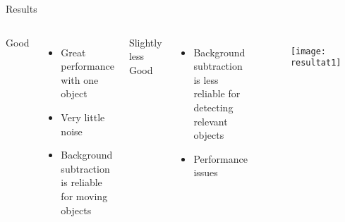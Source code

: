 
\begin{frame}{Results}


	 \begin{columns}[c] %
Good
	\begin{itemize}
	\item Great performance with one object
	\item Very little noise
	\item Background subtraction is reliable for moving objects
	\end{itemize}
	
	\vspace{4mm}
Slightly less Good
	\begin{itemize}
	\item Background subtraction is less reliable for detecting relevant objects
	\item Performance issues
	\end{itemize}
	
    \begin{figure}[H]
	\begin{center}
	\texttt{[image: resultat1]}
	\end{center}
	\end{figure}
    \end{columns}
\end{frame}
